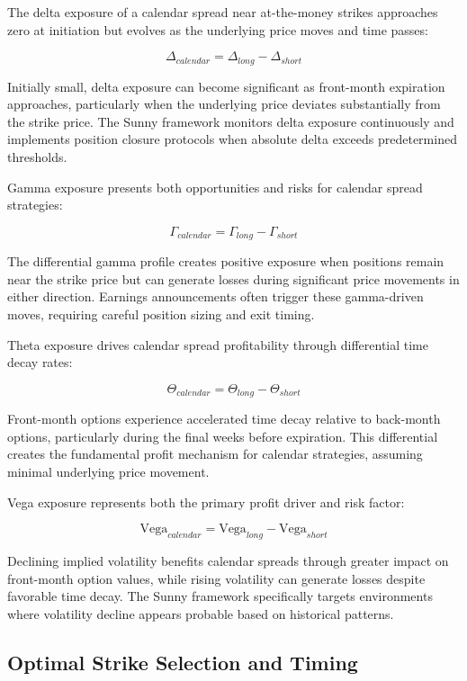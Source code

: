 \documentclass[
  american,
  11pt,
  11pt,
  letterpaper,
  onecolumn]{article}
\begin{document}
The delta exposure of a calendar spread near at-the-money strikes
approaches zero at initiation but evolves as the underlying price moves
and time passes:

\[\Delta_{calendar} = \Delta_{long} - \Delta_{short}\]

Initially small, delta exposure can become significant as front-month
expiration approaches, particularly when the underlying price deviates
substantially from the strike price. The Sunny framework monitors delta
exposure continuously and implements position closure protocols when
absolute delta exceeds predetermined thresholds.

Gamma exposure presents both opportunities and risks for calendar spread
strategies:

\[\Gamma_{calendar} = \Gamma_{long} - \Gamma_{short}\]

The differential gamma profile creates positive exposure when positions
remain near the strike price but can generate losses during significant
price movements in either direction. Earnings announcements often
trigger these gamma-driven moves, requiring careful position sizing and
exit timing.

Theta exposure drives calendar spread profitability through differential
time decay rates:

\[\Theta_{calendar} = \Theta_{long} - \Theta_{short}\]

Front-month options experience accelerated time decay relative to
back-month options, particularly during the final weeks before
expiration. This differential creates the fundamental profit mechanism
for calendar strategies, assuming minimal underlying price movement.

Vega exposure represents both the primary profit driver and risk factor:

\[\text{Vega}_{calendar} = \text{Vega}_{long} - \text{Vega}_{short}\]

Declining implied volatility benefits calendar spreads through greater
impact on front-month option values, while rising volatility can
generate losses despite favorable time decay. The Sunny framework
specifically targets environments where volatility decline appears
probable based on historical patterns.

\subsection{Optimal Strike Selection and
Timing}\label{optimal-strike-selection-and-timing}
\end{document}
